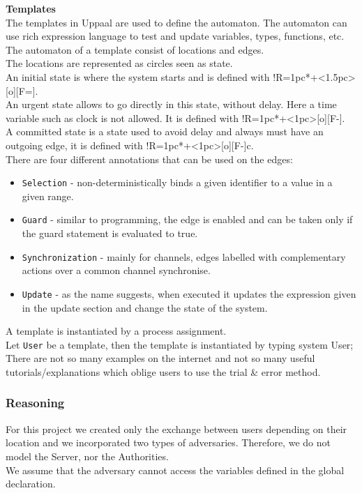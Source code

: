 \documentclass[a4paper, twocolumn]{article}
\begin{document}
\noindent\textbf{Templates}\\
The templates in Uppaal are used to define the automaton. The automaton can use rich expression language to test and update variables, types, functions, etc. The automaton of a template consist of locations and edges.\\
The locations are represented as circles seen as state.\\
An initial state is where the system starts and is defined with \xymatrix@ur@!R=1pc{*+<1.5pc>[o][F=]{}}.\\
An urgent state allows to go directly in this state, without delay. Here a time variable such as clock \cite{tutoUppaal} is not allowed. It is defined with \xymatrix@ur@!R=1pc{*+<1pc>[o][F-]{\cup}}.\\
A committed state is a state used to avoid delay and always must have an outgoing edge, it is defined with \xymatrix@ur@!R=1pc{*+<1pc>[o][F-]{c}}.\\
There are four different annotations that can be used on the edges:
\begin{itemize}
    \item \texttt{Selection} - non-deterministically binds a given identifier to a value in a given range.
    \item \texttt{Guard} - similar to programming, the edge is enabled and can be taken only if the guard statement is evaluated to true.
    \item \texttt{Synchronization} - mainly for channels, edges labelled with complementary actions over a common channel synchronise.
    \item \texttt{Update} - as the name suggests, when executed it updates the expression given in the update section and change the state of the system.
\end{itemize}
A template is instantiated by a process assignment.\\
Let \texttt{User} be a template, then the template is instantiated by typing \colorbox{backcolour}{system User;}\\

\noindent There are not so many examples on the internet and not so many useful tutorials/explanations which oblige users to use the trial \& error method.

\subsubsection{Reasoning} \label{reasoning}
For this project we created only the exchange between users depending on their location and we incorporated two types of adversaries. Therefore, we do not model the Server, nor the Authorities.\\
We assume that the adversary cannot access the variables defined in the global declaration.\\
\end{document}
